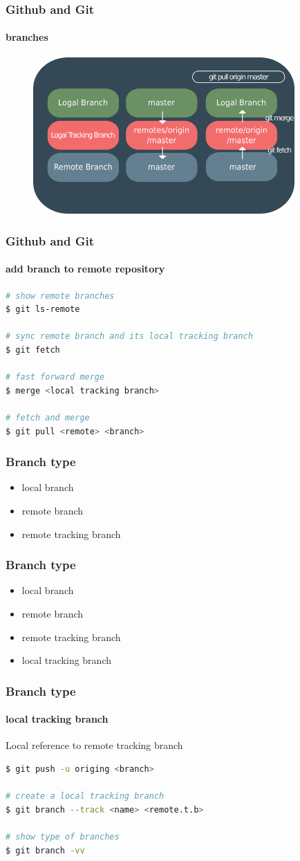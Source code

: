 \documentclass{beamer}
\begin{document}
	\begin{frame}
		\frametitle{Github and Git}
		\framesubtitle{branches}
		\begin{figure}[htbp]
			\centering
			\includegraphics[width=10cm]{remotebranch8}
		\end{figure}
	\end{frame}

	\begin{frame}[fragile]
		\frametitle{Github and Git}
		\framesubtitle{add branch to remote repository}
\begin{lstlisting}[language=bash]
# show remote branches
$ git ls-remote

# sync remote branch and its local tracking branch
$ git fetch

# fast forward merge
$ merge <local tracking branch>

# fetch and merge
$ git pull <remote> <branch>
\end{lstlisting}		
	\end{frame}
	
	\begin{frame}
		\frametitle{Branch type}
		\begin{itemize}
			\item local branch
			\item remote branch
			\item remote tracking branch
		\end{itemize}
	\end{frame}

	\begin{frame}
		\frametitle{Branch type}
		\begin{itemize}
			\item local branch
			\item remote branch
			\item remote tracking branch
			\item local tracking branch		
		\end{itemize}
	\end{frame}

	\begin{frame}[fragile]
		\frametitle{Branch type}
		\framesubtitle{local tracking branch}
		Local reference to remote tracking branch

\begin{lstlisting}[language=bash]
$ git push -u origing <branch>

# create a local tracking branch
$ git branch --track <name> <remote.t.b>

# show type of branches
$ git branch -vv
\end{lstlisting}	
		
	\end{frame}
\end{document}
